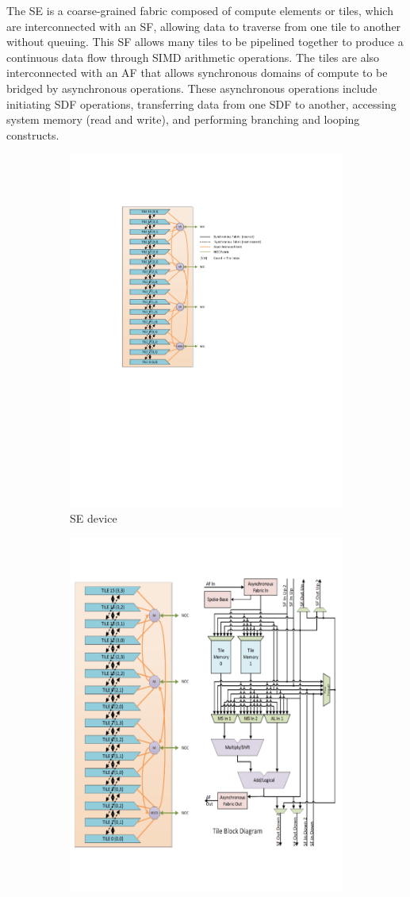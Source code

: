 The SE is a coarse-grained fabric composed of compute elements or tiles, which are interconnected with an SF, allowing data to traverse from one tile to another without queuing.
This SF allows many tiles to be pipelined together to produce a continuous data flow through SIMD arithmetic operations.
The tiles are also interconnected with an AF that allows synchronous domains of compute to be bridged by asynchronous operations.
These asynchronous operations include initiating SDF operations, transferring data from one SDF to another, accessing system memory (read and write), and performing branching and looping constructs.

\begin{figure} [h]
  \begin{subfigure}{.5\textwidth}
    \centering
    \includegraphics[trim=118 310 180 110, clip, width=0.7\linewidth]{fig/se_device.pdf}
    \caption{SE device}
    \label{fig:sub-se}
    \end{subfigure}
  \begin{subfigure}{.5\textwidth}
  \centering
  \includegraphics[trim=300 100 8 50, clip, width=0.5\linewidth]{fig/se_device_tile.pdf}

\end{subfigure}
\end{figure}
